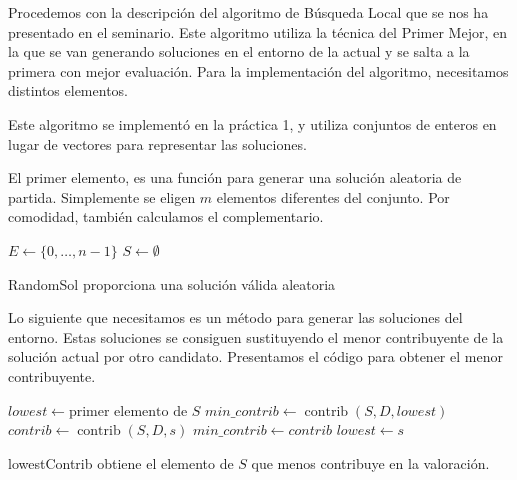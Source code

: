 \documentclass{article}
\begin{document}
Procedemos con la descripción del algoritmo de Búsqueda Local que se nos ha presentado en el seminario. 
Este algoritmo utiliza la técnica del Primer Mejor, en la que se van generando soluciones en el entorno de la actual y se
salta a la primera con mejor evaluación. Para la implementación del algoritmo, necesitamos distintos elementos.

Este algoritmo se implementó en la práctica 1, y utiliza conjuntos de enteros en lugar de vectores para representar
las soluciones.

El primer elemento, es una función para generar una solución aleatoria de partida. Simplemente se eligen $m$ elementos 
diferentes del conjunto. Por comodidad, también calculamos el complementario.

\begin{algorithm}[H]
	\DontPrintSemicolon %
	$E \gets \{0,\ldots, n-1\}$ 
	$S \gets \emptyset$ 
	\;
	 
	\caption{{\sc RandomSol} proporciona una solución válida aleatoria}
	\label{alg:randomsol-ls}
\end{algorithm}

Lo siguiente que necesitamos es un método para generar las soluciones del entorno. Estas soluciones se consiguen sustituyendo
el menor contribuyente de la solución actual por otro candidato. Presentamos el código para obtener el menor contribuyente.

\begin{algorithm}[H]
	\DontPrintSemicolon %
	$lowest \gets \text{primer elemento de } S$\;
	$min\_contrib \gets \operatorname{contrib}(S,D,lowest)$\;
	 {
		$contrib \gets \operatorname{contrib}(S,D,s)$\;
		 { 
			$min\_contrib \gets contrib$\;
			$lowest \gets s$ 
		}
	}
	\;
	\;
	\caption{{\sc lowestContrib} obtiene el elemento de $S$ que menos contribuye en la valoración.}
	\label{alg:lowest-contributor-ls}
\end{algorithm}
\end{document}
